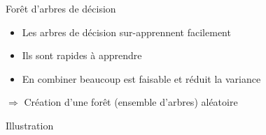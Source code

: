 \begin{frame}{Forêt d'arbres de décision}
    \begin{itemize}
      \item Les arbres de décision sur-apprennent facilement
      \item Ils sont rapides à apprendre
      \item En combiner beaucoup est faisable et réduit la variance
    \end{itemize}
    $\Rightarrow$ Création d'une forêt (ensemble d'arbres) aléatoire
  \end{frame}
  
\begin{frame}{Illustration}
  \end{frame}
  